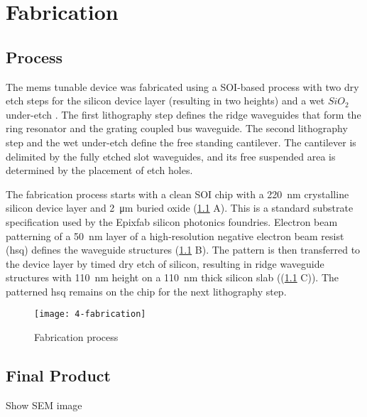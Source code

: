\documentclass[../report.tex]{subfiles}
\begin{document}
	
	
\chapter{Fabrication}

\section{Process}
The \gls{mems} tunable device was fabricated using a SOI-based process with two dry etch steps for the silicon device layer (resulting in two heights) and a wet $SiO_2$ under-etch \cite{errando-herranz_low-power_2015}. The first lithography step defines the ridge waveguides that form the ring resonator and the grating coupled bus waveguide.  The second lithography step and the wet under-etch define the free standing cantilever. The cantilever is delimited by the fully etched slot waveguides, and its free suspended area is determined by the placement of etch holes.

\par The fabrication process starts with a clean SOI chip with a \SI{220}{\nano \meter} crystalline silicon device layer and \SI{2}{\micro \meter} buried oxide (\ref{fig:4_fabrication} A). This is a standard substrate specification used by the Epixfab silicon photonics foundries. Electron beam patterning of a \SI{50}{\nano \meter} layer of a high-resolution negative electron beam resist (\gls{hsq}) defines the waveguide structures (\ref{fig:4_fabrication} B). The pattern is then transferred to the device layer by timed dry etch of silicon, resulting in ridge waveguide structures with \SI{110}{\nano \meter} height on a \SI{110}{\nano \meter} thick silicon slab ((\ref{fig:4_fabrication} C)). The patterned \gls{hsq} remains on the chip for the next lithography step.

\begin{figure}[H] %
	\centering
	\texttt{[image: 4-fabrication]}
	\caption{Fabrication process}
	\label{fig:4_fabrication}
\end{figure} 

\section{Final Product}

Show SEM image
\end{document}
